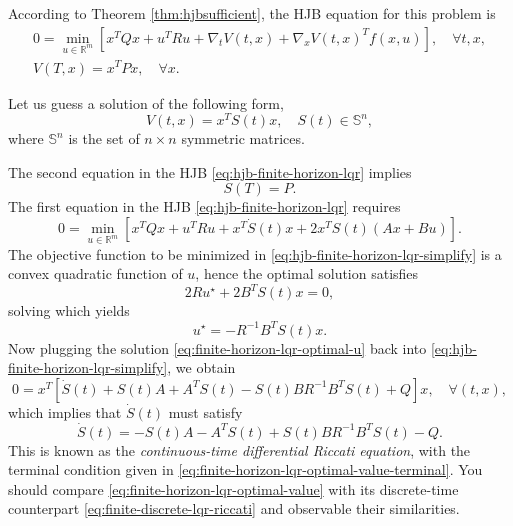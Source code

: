 \documentclass[
]{book}
\theoremstyle{definition}
\theoremstyle{definition}
\theoremstyle{definition}
\theoremstyle{definition}
\theoremstyle{remark}
\begin{document}
According to Theorem \ref{thm:hjbsufficient}, the HJB equation for this problem is
\begin{equation}
\begin{split}
0 = \min_{u \in \mathbb{R}^m } \left[ x^T Q x + u^T R u + \nabla_t V(t,x) + \nabla_x V(t,x)^T f(x,u) \right], \quad \forall t,x, \\
V(T,x) = x^T P x, \quad \forall x.
\end{split}
\label{eq:hjb-finite-horizon-lqr}
\end{equation}

Let us guess a solution of the following form,
\[
V(t,x) = x^T S(t) x, \quad S(t) \in \mathbb{S}^n,
\]
where \(\mathbb{S}^n\) is the set of \(n \times n\) symmetric matrices.

The second equation in the HJB \eqref{eq:hjb-finite-horizon-lqr} implies
\begin{equation}
S(T) = P.
\label{eq:finite-horizon-lqr-optimal-value-terminal}
\end{equation}
The first equation in the HJB \eqref{eq:hjb-finite-horizon-lqr} requires
\begin{equation}
0 = \min_{u \in \mathbb{R}^m} \left[ x^T Q x + u^T R u + x^T \dot{S}(t) x + 2x^T S(t) (A x + Bu)  \right].
\label{eq:hjb-finite-horizon-lqr-simplify}
\end{equation}
The objective function to be minimized in \eqref{eq:hjb-finite-horizon-lqr-simplify} is a convex quadratic function of \(u\), hence the optimal solution satisfies
\[
2 R u^\star + 2B^T S(t) x = 0,
\]
solving which yields
\begin{equation}
u^\star = - R^{-1} B^T S(t) x.
\label{eq:finite-horizon-lqr-optimal-u}
\end{equation}
Now plugging the solution \eqref{eq:finite-horizon-lqr-optimal-u} back into \eqref{eq:hjb-finite-horizon-lqr-simplify}, we obtain
\[
0 = x^T \left[ \dot{S}(t) + S(t) A + A^T S(t) - S(t)B R^{-1} B^T S(t) + Q \right] x, \quad \forall (t,x),
\]
which implies that \(\dot{S}(t)\) must satisfy
\begin{equation}
\dot{S}(t) = - S(t) A - A^T S(t) + S(t) B R^{-1} B^T S(t) - Q.
\label{eq:finite-horizon-lqr-optimal-value}
\end{equation}
This is known as the \emph{continuous-time differential Riccati equation}, with the terminal condition given in \eqref{eq:finite-horizon-lqr-optimal-value-terminal}. You should compare \eqref{eq:finite-horizon-lqr-optimal-value} with its discrete-time counterpart \eqref{eq:finite-discrete-lqr-riccati} and observable their similarities.
\end{document}
